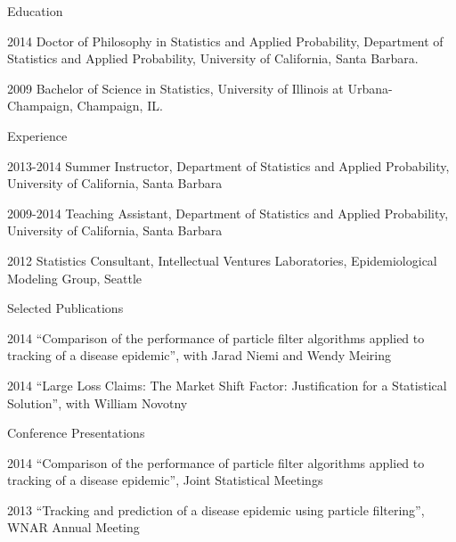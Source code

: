   \approvalpage
  \copyrightpage

  \begin{acknowledgements}


  \end{acknowledgements}
\ssp
  \begin{vitae}

    {\small
      \begin{vitaesection}{Education}
        \vspace{-0.1cm}
      \item [2014] Doctor of Philosophy in Statistics and Applied Probability, Department of
           Statistics and Applied Probability, University of California, Santa Barbara.
      \item [2009] Bachelor of Science in Statistics, University of Illinois at Urbana-Champaign, Champaign, IL.
      \end{vitaesection}

      \begin{vitaesection}{Experience}
        \vspace{-0.1cm}
      \item [2013-2014] Summer Instructor, Department of Statistics and Applied Probability, University of California, Santa Barbara
      \item [2009-2014] Teaching Assistant, Department of Statistics and Applied Probability, University of California, Santa Barbara
      \item [2012] Statistics Consultant, Intellectual Ventures Laboratories, Epidemiological Modeling Group, Seattle
      \end{vitaesection}

      \begin{vitaesection}{Selected Publications}
        \vspace{-0.1cm}
      \item [2014] ``Comparison of the performance of particle filter algorithms applied to tracking of a disease epidemic'', with Jarad Niemi and Wendy Meiring
      \item [2014] ``Large Loss Claims: The Market Shift Factor: Justification for a Statistical Solution'', with William Novotny
        \vspace{0.3cm}
      \end{vitaesection}

      \begin{vitaesection}{Conference Presentations}
        \vspace{-0.1cm}
      \item [2014] ``Comparison of the performance of particle filter algorithms applied to tracking of a disease epidemic'', Joint Statistical Meetings
      \item [2013] ``Tracking and prediction of a disease epidemic using particle filtering'', WNAR Annual Meeting
        \vspace{0.3cm}
      \end{vitaesection}

}
\end{vitae}
